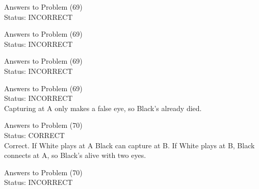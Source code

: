 \documentclass[11pt]{article}
\begin{document}
\begin{minipage}[t]{0.5\textwidth}
  {\centering
  
  Answers to Problem (69)\\
  Status: INCORRECT\\
  
  }
\end{minipage}
\begin{minipage}[t]{0.5\textwidth}
  {\centering
  
  Answers to Problem (69)\\
  Status: INCORRECT\\
  
  }
\end{minipage}
\begin{minipage}[t]{0.5\textwidth}
  {\centering
  
  Answers to Problem (69)\\
  Status: INCORRECT\\
  
  }
\end{minipage}
\begin{minipage}[t]{0.5\textwidth}
  {\centering
  
  Answers to Problem (69)\\
  Status: INCORRECT\\
  Capturing at A only makes a false eye, so Black's already died.\\
  }
\end{minipage}
\begin{minipage}[t]{0.5\textwidth}
  {\centering
  
  Answers to Problem (70)\\
  Status: CORRECT\\
  Correct. If White plays at A Black can capture at B. If White plays at B, Black connects at A, so Black's alive with two eyes.\\
  }
\end{minipage}
\begin{minipage}[t]{0.5\textwidth}
  {\centering
  
  Answers to Problem (70)\\
  Status: INCORRECT\\
  
  }
\end{minipage}
\end{document}

